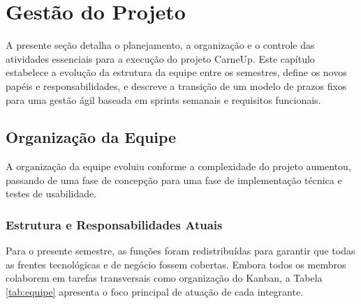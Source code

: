 \documentclass[
	12pt,				%
	openany,			%
	oneside,			%
	a4paper,			%
	english,			%
	french,				%
	spanish,			%
	brazil				%
	]{abntex2}
\begin{document}
\chapter{Gestão do Projeto}

A presente seção detalha o planejamento, a organização e o controle das atividades essenciais para a execução do projeto CarneUp. Este capítulo estabelece a evolução da estrutura da equipe entre os semestres, define os novos papéis e responsabilidades, e descreve a transição de um modelo de prazos fixos para uma gestão ágil baseada em sprints semanais e requisitos funcionais.

\section{Organização da Equipe}

A organização da equipe evoluiu conforme a complexidade do projeto aumentou, passando de uma fase de concepção para uma fase de implementação técnica e testes de usabilidade.

\subsection{Estrutura e Responsabilidades Atuais}

Para o presente semestre, as funções foram redistribuídas para garantir que todas as frentes tecnológicas e de negócio fossem cobertas. Embora todos os membros colaborem em tarefas transversais como organização do Kanban, a Tabela \ref{tab:equipe} apresenta o foco principal de atuação de cada integrante.
\end{document}
